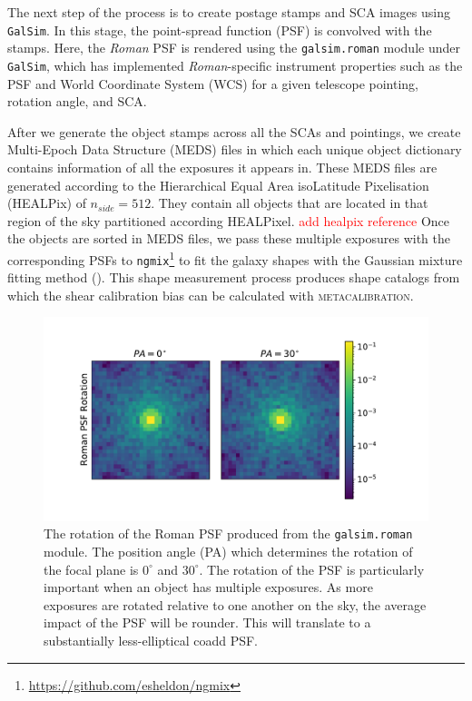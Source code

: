 \documentclass[fleqn,usenatbib]{mnras}
\begin{document}
The next step of the process is to create postage stamps and SCA images using \texttt{GalSim}. In this stage, the point-spread function (PSF) is convolved with the stamps. Here, the \emph{Roman} PSF is rendered using the \texttt{galsim.roman} module under \texttt{GalSim}, which has implemented \emph{Roman}-specific instrument properties such as the PSF and World Coordinate System (WCS) for a given telescope pointing, rotation angle, and SCA.


After we generate the object stamps across all the SCAs and pointings, we create Multi-Epoch Data Structure (MEDS) files in which each unique object dictionary contains information of all the exposures it appears in. These MEDS files are generated according to the Hierarchical Equal Area isoLatitude Pixelisation (HEALPix) of $n_{side}=512$. They contain all objects that are located in that region of the sky partitioned according HEALPixel. \textcolor{red}{add healpix reference} Once the objects are sorted in MEDS files, we pass these multiple exposures with the corresponding PSFs to \texttt{ngmix}\footnote{\url{ https://github.com/esheldon/ngmix}} to fit the galaxy shapes with the Gaussian mixture fitting method (\citealt{2014MNRAS.444L..25S}). This shape measurement process produces shape catalogs from which the shear calibration bias can be calculated with \textsc{metacalibration}.

\begin{figure}
	\includegraphics[width=\columnwidth]{figure1.pdf}
	\vspace*{-3mm}
    \caption{The rotation of the Roman PSF produced from the \texttt{galsim.roman} module. The position angle (PA) which determines the rotation of the focal plane is $0^{\circ}$ and $30^{\circ}$. The rotation of the PSF is particularly important when an object has multiple exposures. As more exposures are rotated relative to one another on the sky, the average impact of the PSF will be rounder. This will translate to a substantially less-elliptical coadd PSF.}
    \label{fig:psfrot}
\end{figure}
\end{document}
